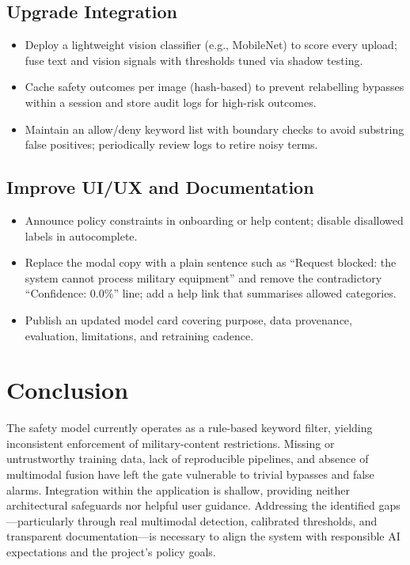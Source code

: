 \documentclass[conference]{IEEEtran}
\begin{document}
\subsection{Upgrade Integration}
\begin{itemize}[leftmargin=*]
  \item Deploy a lightweight vision classifier (e.g., MobileNet) to score every upload; fuse text and vision signals with thresholds tuned via shadow testing.
  \item Cache safety outcomes per image (hash-based) to prevent relabelling bypasses within a session and store audit logs for high-risk outcomes.
  \item Maintain an allow/deny keyword list with boundary checks to avoid substring false positives; periodically review logs to retire noisy terms.
\end{itemize}

\subsection{Improve UI/UX and Documentation}
\begin{itemize}[leftmargin=*]
  \item Announce policy constraints in onboarding or help content; disable disallowed labels in autocomplete.
  \item Replace the modal copy with a plain sentence such as ``Request blocked: the system cannot process military equipment'' and remove the contradictory ``Confidence: 0.0\%'' line; add a help link that summarises allowed categories.
  \item Publish an updated model card covering purpose, data provenance, evaluation, limitations, and retraining cadence.
\end{itemize}

\section{Conclusion}
The safety model currently operates as a rule-based keyword filter, yielding inconsistent enforcement of military-content restrictions. Missing or untrustworthy training data, lack of reproducible pipelines, and absence of multimodal fusion have left the gate vulnerable to trivial bypasses and false alarms. Integration within the application is shallow, providing neither architectural safeguards nor helpful user guidance. Addressing the identified gaps---particularly through real multimodal detection, calibrated thresholds, and transparent documentation---is necessary to align the system with responsible AI expectations and the project’s policy goals.
\end{document}
